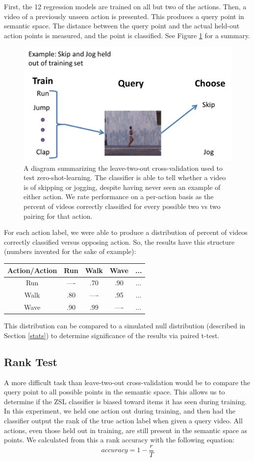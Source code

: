 \documentclass{article}
\begin{document}
First, the 12 regression models are trained on all but two of the actions. Then, a video of a previously unseen action is presented. This produces a query point in semantic space. The distance between the query point and the actual held-out action points is measured, and the point is classified. See Figure \ref{ltocv} for a summary.

\begin{figure}[h]
  \centering
  \includegraphics[width = .45\linewidth]{ltocv}
  \caption{A diagram summarizing the leave-two-out cross-validation used to test zero-shot-learning. The classifier is able to tell whether a video is of skipping or jogging, despite having never seen an example of either action. We rate performance on a per-action basis as the percent of videos correctly classified for every possible two vs two pairing for that action.}
  \label{ltocv}
\end{figure}

For each action label, we were able to produce a distribution of percent of videos correctly classified versus opposing action. So, the results have this structure (numbers invented for the sake of example):

\begin{table}[h]
\centering
\begin{tabular}{c|c|c|c|c}
Action/Action & Run & Walk & Wave & ... \\ \hline
Run & ---- & .70 & .90 & ... \\ \hline
Walk & .80 & ---- & .95 & ... \\ \hline
Wave & .90 & .99 & ---- & ... \\
\end{tabular}
\end{table}

This distribution can be compared to a simulated null distribution (described in Section \ref{stats}) to determine significance of the results via paired t-test.

\subsection{Rank Test}
A more difficult task than leave-two-out cross-validation would be to compare the query point to all possible points in the semantic space. This allows us to determine if the ZSL classifier is biased toward items it has seen during training. In this experiment, we held one action out during training, and then had the classifier output the rank of the true action label when given a query video. All actions, even those held out in training, are still present in the semantic space as points. We calculated from this a rank accuracy with the following equation:
\begin{equation}
accuracy = 1 - \frac{r}{T}
\end{equation}
\end{document}
